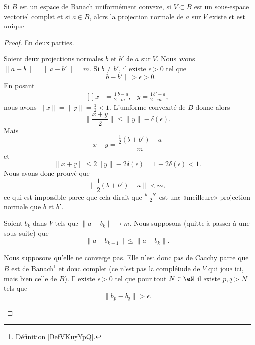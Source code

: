 	\begin{theorem}     \label{THOooOOVVooMhzHqd}
		Si \( B\) est un espace de Banach uniformément convexe, si \( V\subset B\) est un sous-espace vectoriel complet et si \( a\in B\), alors la projection normale de \( a\) sur \( V\) existe et est unique.
	\end{theorem}

	\begin{proof}
		En deux parties.
		\begin{subproof}
			\spitem[Unicité]
			Soient deux projections normales \( b\) et \( b'\) de \( a\) sur \( V\). Nous avons \( \| a-b \|=\| a-b' \|=m\). Si \( b\neq b'\), il existe \( \epsilon>0\) tel que
			\begin{equation}
				\| b-b' \|>\epsilon>0.
			\end{equation}
			En posant
			\begin{equation}
				\begin{aligned}[]
					x & =\frac{ 1 }{2}\frac{ b-a }{ m }, & y=\frac{ 1 }{2}\frac{ b'-a }{ m },
				\end{aligned}
			\end{equation}
			nous avons \( \| x \|=\| y \|=\frac{ 1 }{2}<1\). L'uniforme convexité de \( B\) donne alors
			\begin{equation}
				\| \frac{ x+y }{2} \|\leq \| y \|-\delta(\epsilon).
			\end{equation}
			Mais
			\begin{equation}
				x+y=\frac{ \frac{ 1 }{2}(b+b')-a }{ m }
			\end{equation}
			et
			\begin{equation}
				\| x+y \|\leq 2\| y \|-2\delta(\epsilon)=1-2\delta(\epsilon)<1.
			\end{equation}
			Nous avons donc prouvé que
			\begin{equation}
				\| \frac{ 1 }{2}(b+b')-a \|<m,
			\end{equation}
			ce qui est impossible parce que cela dirait que \( \frac{ b+b' }{2}\) est une «meilleure» projection normale que \( b\) et \( b'\).

			\spitem[Existence]
			Soient \( b_k\) dans \( V\) tels que \( \| a-b_k \|\to m\). Nous supposons (quitte à passer à une sous-suite) que
			\begin{equation}
				\| a-b_{k+1} \|\leq \| a-b_k \|.
			\end{equation}
			\begin{subproof}
				Nous supposons qu'elle ne converge pas. Elle n'est donc pas de Cauchy parce que \( B\) est de Banach\footnote{Définition \ref{DefVKuyYpQ}.} et donc complet (ce n'est pas la complétude de \( V\) qui joue ici, mais bien celle de \( B\)). Il existe \( \epsilon>0\) tel que pour tout \( N\in \eN\) il existe \( p,q>N\) tels que
				\begin{equation}
					\| b_p-b_q \|>\epsilon.
				\end{equation}


\end{subproof}
\end{subproof}
\end{proof}
